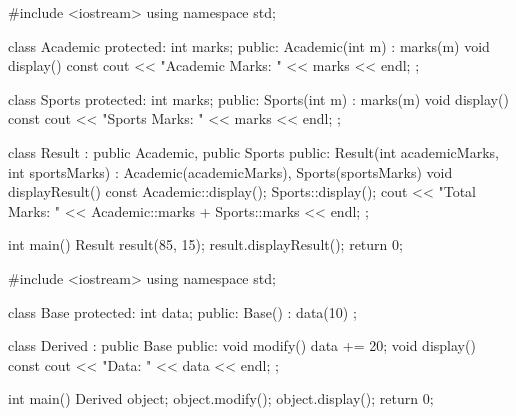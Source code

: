 \outputlabel
{}


\codelabel

\begin{code}
#include <iostream>
using namespace std;

class Academic {
protected:
    int marks;
public:
    Academic(int m) : marks(m) {}
    void display() const { cout << "Academic Marks: " << marks << endl; }
};

class Sports {
protected:
    int marks;
public:
    Sports(int m) : marks(m) {}
    void display() const { cout << "Sports Marks: " << marks << endl; }
};

class Result : public Academic, public Sports {
public:
    Result(int academicMarks, int sportsMarks) : Academic(academicMarks), Sports(sportsMarks) {}
    void displayResult() const {
        Academic::display(); Sports::display();
        cout << "Total Marks: " << Academic::marks + Sports::marks << endl;
    }
};

int main() {
    Result result(85, 15);
    result.displayResult();
    return 0;
}
\end{code}

\outputlabel
{}


\codelabel

\begin{code}
#include <iostream>
using namespace std;

class Base {
protected:
    int data;
public:
    Base() : data(10) {}
};

class Derived : public Base {
public:
    void modify() { data += 20; }
    void display() const { cout << "Data: " << data << endl; }
};

int main() {
    Derived object;
    object.modify(); object.display();
    return 0;
}
\end{code}

\outputlabel
{}

